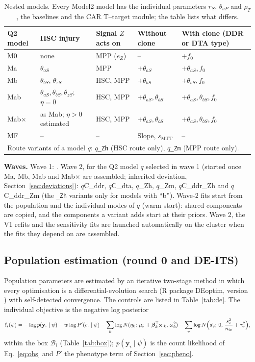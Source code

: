 \documentclass[11pt]{article}
\begin{document}
\begin{table}[!htbp]
\centering\footnotesize
\setlength{\tabcolsep}{4pt}
\caption{Nested models. Every Model2 model has the individual parameters $r_S$, $\theta_{aP}$ and $\rho_T$, the baselines and the CAR T--target module; the table lists what differs.}\label{tab:models}
\begin{tabular}{lllll}
\toprule
Q2 model & HSC injury & Signal $Z$ acts on & Without clone & With clone (DDR or DTA type)\\
\midrule
M0 & none & MPP ($e_Z$) & -- & $+f_0$\\
Ma & $\theta_{aS}$ & MPP & $+\theta_{aS}$ & $+\theta_{aS},f_0$\\
Mb & $\theta_{bS}$, $\theta_{zS}$ & HSC, MPP & $+\theta_{bS}$ & $+\theta_{bS},f_0$\\
Mab & $\theta_{aS},\theta_{bS},\theta_{zS}$; $\eta=0$ & HSC, MPP & $+\theta_{aS},\theta_{bS}$ & $+\theta_{aS},\theta_{bS},f_0$\\
Mab$\times$ & as Mab; $\eta>0$ estimated & HSC, MPP & $+\theta_{aS},\theta_{bS}$ & $+\theta_{aS},\theta_{bS},f_0$\\
MF & -- & -- & Slope, $s_{\mathrm{MTT}}$ & --\\
\midrule
\multicolumn{5}{l}{Route variants of a model $q$: $q$\texttt{\_Zh} (HSC route only), $q$\texttt{\_Zm} (MPP route only).}\\
\bottomrule
\end{tabular}
\end{table}

\textbf{Waves.} Wave 1: \valWaveOne. Wave 2, for the Q2 model $q$ selected in wave 1 (started once Ma, Mb, Mab and Mab$\times$ are assembled; inherited deviation, Section~\ref{sec:deviations}): $q$C\_ddr, $q$C\_dta, $q$\_Zh, $q$\_Zm, $q$C\_ddr\_Zh and $q$C\_ddr\_Zm (the \texttt{\_Zh} variants only for models with ``b''). Wave-2 fits start from the population and the individual modes of $q$ (warm start): shared components are copied, and the components a variant adds start at their priors. Wave 2, the V1 refits and the sensitivity fits are launched automatically on the cluster when the fits they depend on are assembled.

\subsection{Population estimation (round 0 and DE-ITS)}\label{sec:its}
Population parameters are estimated by an iterative two-stage method \citep{steimer1984} in which every optimisation is a differential-evolution search (R package DEoptim, version \valDEoptim) with self-detected convergence. The controls are listed in Table~\ref{tab:de}. The individual objective is the negative log posterior
\begin{equation}
\ell_i(\psi) = -\log p(\mathbf y_i\mid\psi)-w\log P'(c_i\mid\psi)-\sum_k\log N(\eta_{k};\,\mu_k+\boldsymbol\beta_k^\top\mathbf x_{ik},\,\omega_k^2)-\sum_v\log N\Bigl(d_{v};\,0,\,\frac{s_v^2}{n_{iv}}+\tau_v^2\Bigr), \label{eq:nlp}
\end{equation}
within the box $\mathcal B_i$ (Table~\ref{tab:box}); $p(\mathbf y_i\mid\psi)$ is the count likelihood of Eq.~\ref{eq:obs} and $P'$ the phenotype term of Section~\ref{sec:pheno}.
\end{document}
